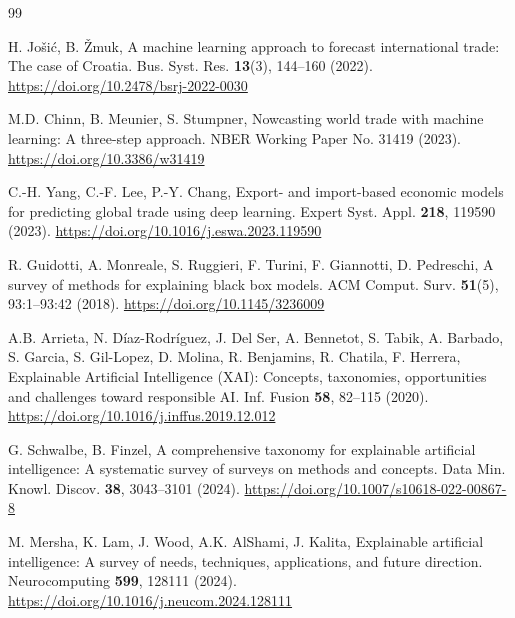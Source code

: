\documentclass[pdftex,sn-mathphys-num]{sn-jnl}
\begin{document}
\begin{thebibliography}{99}

 H. Jo{\v{s}}i{\'c}, B. {\v{Z}}muk, A machine learning approach to forecast international trade: The case of Croatia. Bus. Syst. Res. \textbf{13}(3), 144--160 (2022). \url{https://doi.org/10.2478/bsrj-2022-0030}

 M.D. Chinn, B. Meunier, S. Stumpner, Nowcasting world trade with machine learning: A three-step approach. NBER Working Paper No. 31419 (2023). \url{https://doi.org/10.3386/w31419}

 C.-H. Yang, C.-F. Lee, P.-Y. Chang, Export- and import-based economic models for predicting global trade using deep learning. Expert Syst. Appl. \textbf{218}, 119590 (2023). \url{https://doi.org/10.1016/j.eswa.2023.119590}

 R. Guidotti, A. Monreale, S. Ruggieri, F. Turini, F. Giannotti, D. Pedreschi, A survey of methods for explaining black box models. ACM Comput. Surv. \textbf{51}(5), 93:1--93:42 (2018). \url{https://doi.org/10.1145/3236009}

 A.B. Arrieta, N. D{\'i}az-Rodr{\'i}guez, J. Del Ser, A. Bennetot, S. Tabik, A. Barbado, S. Garcia, S. Gil-Lopez, D. Molina, R. Benjamins, R. Chatila, F. Herrera, Explainable Artificial Intelligence (XAI): Concepts, taxonomies, opportunities and challenges toward responsible AI. Inf. Fusion \textbf{58}, 82--115 (2020). \url{https://doi.org/10.1016/j.inffus.2019.12.012}

 G. Schwalbe, B. Finzel, A comprehensive taxonomy for explainable artificial intelligence: A systematic survey of surveys on methods and concepts. Data Min. Knowl. Discov. \textbf{38}, 3043--3101 (2024). \url{https://doi.org/10.1007/s10618-022-00867-8}

 M. Mersha, K. Lam, J. Wood, A.K. AlShami, J. Kalita, Explainable artificial intelligence: A survey of needs, techniques, applications, and future direction. Neurocomputing \textbf{599}, 128111 (2024). \url{https://doi.org/10.1016/j.neucom.2024.128111}


\end{thebibliography}
\end{document}
